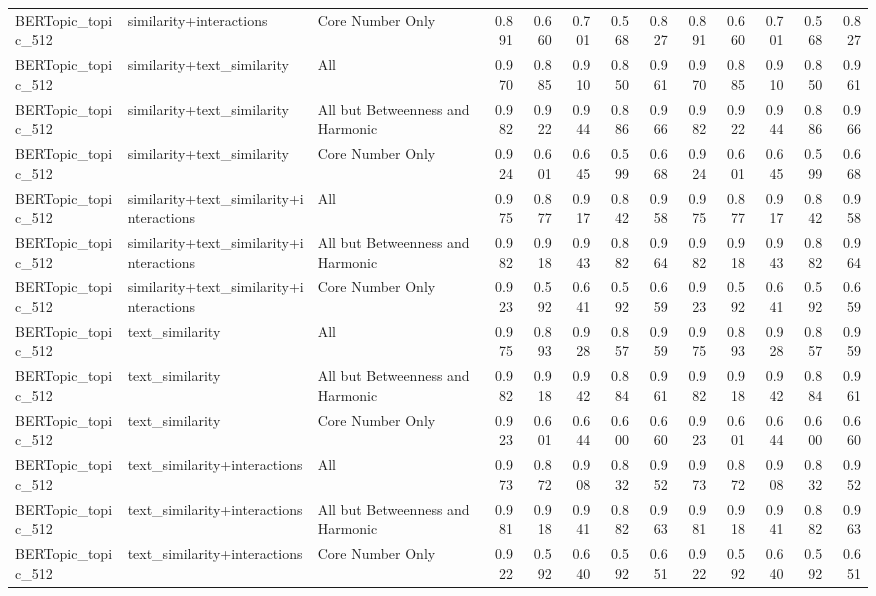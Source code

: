 \begin{tabular}{lllrrrrrrrrrr}
BERTopic_topic_512 & similarity+interactions & Core Number Only & 0.891 & 0.660 & 0.701 & 0.568 & 0.827 & 0.891 & 0.660 & 0.701 & 0.568 & 0.827 \\
BERTopic_topic_512 & similarity+text_similarity & All & 0.970 & 0.885 & 0.910 & 0.850 & 0.961 & 0.970 & 0.885 & 0.910 & 0.850 & 0.961 \\
BERTopic_topic_512 & similarity+text_similarity & All but Betweenness and Harmonic & 0.982 & 0.922 & 0.944 & 0.886 & 0.966 & 0.982 & 0.922 & 0.944 & 0.886 & 0.966 \\
BERTopic_topic_512 & similarity+text_similarity & Core Number Only & 0.924 & 0.601 & 0.645 & 0.599 & 0.668 & 0.924 & 0.601 & 0.645 & 0.599 & 0.668 \\
BERTopic_topic_512 & similarity+text_similarity+interactions & All & 0.975 & 0.877 & 0.917 & 0.842 & 0.958 & 0.975 & 0.877 & 0.917 & 0.842 & 0.958 \\
BERTopic_topic_512 & similarity+text_similarity+interactions & All but Betweenness and Harmonic & 0.982 & 0.918 & 0.943 & 0.882 & 0.964 & 0.982 & 0.918 & 0.943 & 0.882 & 0.964 \\
BERTopic_topic_512 & similarity+text_similarity+interactions & Core Number Only & 0.923 & 0.592 & 0.641 & 0.592 & 0.659 & 0.923 & 0.592 & 0.641 & 0.592 & 0.659 \\
BERTopic_topic_512 & text_similarity & All & 0.975 & 0.893 & 0.928 & 0.857 & 0.959 & 0.975 & 0.893 & 0.928 & 0.857 & 0.959 \\
BERTopic_topic_512 & text_similarity & All but Betweenness and Harmonic & 0.982 & 0.918 & 0.942 & 0.884 & 0.961 & 0.982 & 0.918 & 0.942 & 0.884 & 0.961 \\
BERTopic_topic_512 & text_similarity & Core Number Only & 0.923 & 0.601 & 0.644 & 0.600 & 0.660 & 0.923 & 0.601 & 0.644 & 0.600 & 0.660 \\
BERTopic_topic_512 & text_similarity+interactions & All & 0.973 & 0.872 & 0.908 & 0.832 & 0.952 & 0.973 & 0.872 & 0.908 & 0.832 & 0.952 \\
BERTopic_topic_512 & text_similarity+interactions & All but Betweenness and Harmonic & 0.981 & 0.918 & 0.941 & 0.882 & 0.963 & 0.981 & 0.918 & 0.941 & 0.882 & 0.963 \\
BERTopic_topic_512 & text_similarity+interactions & Core Number Only & 0.922 & 0.592 & 0.640 & 0.592 & 0.651 & 0.922 & 0.592 & 0.640 & 0.592 & 0.651 \\
\bottomrule
\end{tabular}
